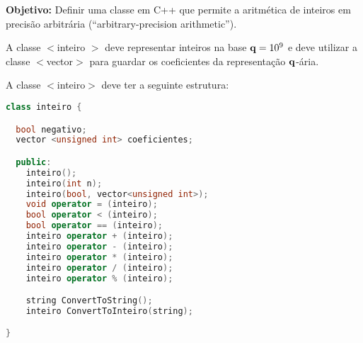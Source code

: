 
\usepackage{hyperref}
\newcommand{\shift}[1]{\setlength{\leftskip}{15 mm}{#1}\medskip}





\nextsect


{\bf Objetivo:} Definir uma classe em C++ que permite a aritmética de inteiros em precisão arbitrária (``arbitrary-precision arithmetic'').

 A classe $<$inteiro $>$ deve representar inteiros na base $\mathbf{q}=10^9$ e deve 
utilizar a classe $<$vector$>$ para guardar os coeficientes da representação $\mathbf{q}$-ária.

A classe $<$inteiro$>$ deve ter a seguinte estrutura:

\begin{lstlisting}[language=C++]
class inteiro {

  bool negativo; 
  vector <unsigned int> coeficientes;

  public:
    inteiro();
    inteiro(int n);
    inteiro(bool, vector<unsigned int>);
    void operator = (inteiro);
    bool operator < (inteiro);
    bool operator == (inteiro);
    inteiro operator + (inteiro);
    inteiro operator - (inteiro);
    inteiro operator * (inteiro);
    inteiro operator / (inteiro);
    inteiro operator % (inteiro);

    string ConvertToString();
    inteiro ConvertToInteiro(string);

}
\end{lstlisting}


